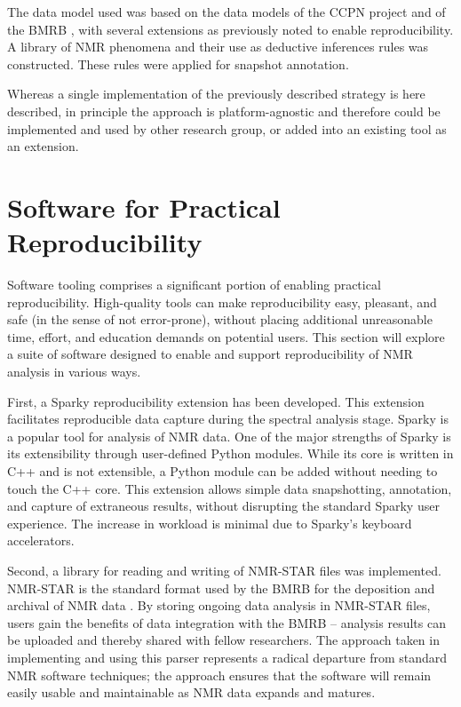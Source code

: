 The data model used was based on the data models of the CCPN project \cite{ccpn}
and of the BMRB \cite{bmrb}, with several 
extensions as previously noted to enable reproducibility.  A library of NMR 
phenomena and their use as deductive inferences rules was constructed.  
These rules were applied for snapshot annotation.

Whereas a single implementation of the previously described strategy is 
here described, in principle the approach is platform-agnostic and 
therefore could be implemented and used by other research group, or added 
into an existing tool as an extension.


\section{Software for Practical Reproducibility}
Software tooling comprises a significant portion of enabling practical 
reproducibility.  High-quality tools can make reproducibility easy, pleasant, 
and safe (in the sense of not error-prone), without placing additional 
unreasonable time, effort, and education demands on potential users.  This 
section will explore a suite of software designed to enable and support 
reproducibility of NMR analysis in various ways.
	
First, a Sparky reproducibility extension has been developed.  This extension
facilitates reproducible data capture during the spectral analysis stage. Sparky 
\cite{sparky} is a popular tool for analysis of NMR data.  One of the major 
strengths of Sparky is its extensibility through user-defined Python modules.  
While its core is written in C++ and is not extensible, a Python module can 
be added without needing to touch the C++ core.  This extension allows
simple data snapshotting, annotation, and capture of extraneous results,
without disrupting the standard Sparky user experience.  The increase in
workload is minimal due to Sparky's keyboard accelerators.

Second, a library for reading and writing of NMR-STAR files was implemented.  
NMR-STAR is the standard format used by the BMRB for the deposition and 
archival of NMR data \cite{hall1991star, hall1994star, hall1995star}.
By storing ongoing data analysis in NMR-STAR files, 
users gain the benefits of data integration with the BMRB -- analysis results 
can be uploaded and thereby shared with fellow researchers.  The approach 
taken in implementing and using this parser represents a radical departure 
from standard NMR software techniques; the approach ensures that the 
software will remain easily usable and maintainable as NMR data expands 
and matures.

